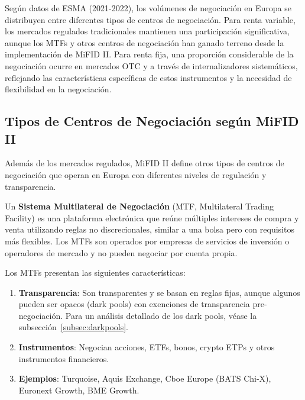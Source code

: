 \begin{proposicion}
Según datos de ESMA (2021-2022), los volúmenes de negociación en Europa se distribuyen entre diferentes tipos de centros de negociación. Para renta variable, los mercados regulados tradicionales mantienen una participación significativa, aunque los MTFs y otros centros de negociación han ganado terreno desde la implementación de MiFID II. Para renta fija, una proporción considerable de la negociación ocurre en mercados OTC y a través de internalizadores sistemáticos, reflejando las características específicas de estos instrumentos y la necesidad de flexibilidad en la negociación.
\end{proposicion}

\subsection{Tipos de Centros de Negociación según MiFID II}

Además de los mercados regulados, MiFID II define otros tipos de centros de negociación que operan en Europa con diferentes niveles de regulación y transparencia.

\begin{definicion}
\label{def:mtf}
Un \textbf{Sistema Multilateral de Negociación} (MTF, Multilateral Trading Facility) es una plataforma electrónica que reúne múltiples intereses de compra y venta utilizando reglas no discrecionales, similar a una bolsa pero con requisitos más flexibles. Los MTFs son operados por empresas de servicios de inversión o operadores de mercado y no pueden negociar por cuenta propia.
\end{definicion}

\begin{teorema}
Los MTFs presentan las siguientes características:
\begin{enumerate}
\item \textbf{Transparencia}: Son transparentes y se basan en reglas fijas, aunque algunos pueden ser opacos (dark pools) con exenciones de transparencia pre-negociación. Para un análisis detallado de los dark pools, véase la subsección~\ref{subsec:darkpools}.
\item \textbf{Instrumentos}: Negocian acciones, ETFs, bonos, crypto ETPs y otros instrumentos financieros.
\item \textbf{Ejemplos}: Turquoise, Aquis Exchange, Cboe Europe (BATS Chi-X), Euronext Growth, BME Growth.
\end{enumerate}
\end{teorema}

